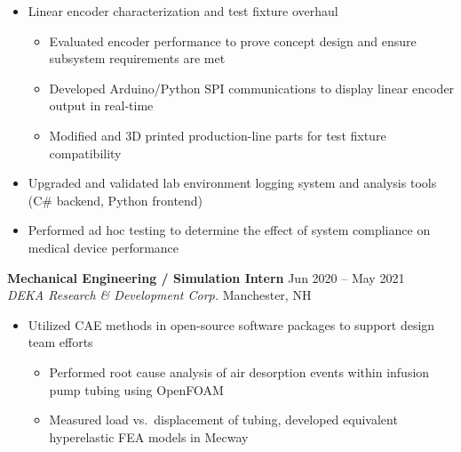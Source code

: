 \documentclass{my_resume}
\begin{document}
\begin{itemize}[label={\tiny\raisebox{1ex}{\textbullet}}, noitemsep, leftmargin=0.75cm]
    \item Linear encoder characterization and test fixture overhaul
          \begin{itemize}[label={\tiny\raisebox{1ex}{\textbullet}}, noitemsep, leftmargin=0.75cm]
              \item Evaluated encoder performance to prove concept design and ensure subsystem requirements are met
              \item Developed Arduino/Python SPI communications to display linear encoder output in real-time
              \item Modified and 3D printed production-line parts for test fixture compatibility
          \end{itemize}
    \item Upgraded and validated lab environment logging system and analysis tools (C\# backend, Python frontend)
    \item Performed ad hoc testing to determine the effect of system compliance on medical device performance
\end{itemize}
\smallskip
{\textbf{Mechanical Engineering / Simulation Intern}} \hfill {Jun 2020 -- May 2021}
\\ {\em DEKA Research \& Development Corp.} \hfill {Manchester, NH}
\begin{itemize}[label={\tiny\raisebox{1ex}{\textbullet}}, noitemsep, leftmargin=0.75cm]
    \item Utilized CAE methods in open-source software packages to support design team efforts
          \begin{itemize}[label={\tiny\raisebox{1ex}{\textbullet}}, noitemsep, leftmargin=0.75cm]
              \item Performed root cause analysis of air desorption events within infusion pump tubing using OpenFOAM
              \item Measured load vs.\ displacement of tubing, developed equivalent hyperelastic FEA models in Mecway
          \end{itemize}{}
\end{itemize}

\vspace{-1.25em}
\end{document}
